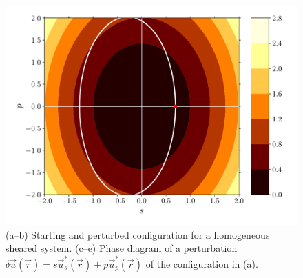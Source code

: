 \documentclass[fleqn]{goose-article}
\begin{document}
\begin{figure}[htp]
\begin{minipage}[t]{.31\textwidth}
        \centering
        \includegraphics[width=\textwidth]{example_shear_phase-diagram_energy-contour.pdf}
    \end{minipage}
    \caption{
        (a--b) Starting and perturbed configuration for a homogeneous sheared system.
        (c--e) Phase diagram of a perturbation
        $\delta \vec{u}(\vec{r}) = s \vec{u}^*_s (\vec{r}) + p \vec{u}^*_p (\vec{r})$
        of the configuration in (a).
    }
    \label{fig:example:shear}
\end{figure}
\end{document}
